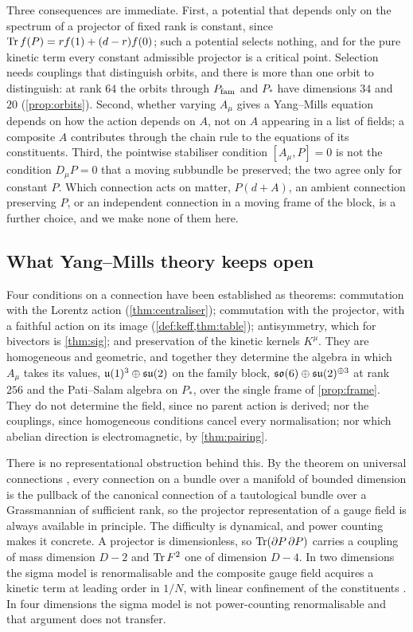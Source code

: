 Three consequences are immediate. First, a potential that depends only on the spectrum of a projector of fixed rank is constant,
since $\operatorname{Tr} f(P)=rf(1)+(d-r)f(0)$; such a potential selects nothing, and for the pure kinetic term every constant admissible projector
is a critical point. Selection needs couplings that distinguish orbits, and there is more than one orbit to distinguish: at rank
$64$ the orbits through $P_{\rm fam}$ and $P_*$ have dimensions $34$ and $20$ (\cref{prop:orbits}). Second, whether varying $A_\mu$ gives a
Yang--Mills equation depends on how the action depends on $A$, not on $A$ appearing in a list of fields; a composite $A$ contributes
through the chain rule to the equations of its constituents. Third, the pointwise stabiliser condition $[A_\mu,P]=0$ is not the
condition $D_\mu P=0$ that a moving subbundle be preserved; the two agree only for constant $P$. Which connection acts on matter,
$P(d+A)$, an ambient connection preserving $P$, or an independent connection in a moving frame of the block, is a further choice,
and we make none of them here.

\subsection{What Yang--Mills theory keeps open}
\label{sec:ym}

Four conditions on a connection have been established as theorems: commutation with the Lorentz action
(\cref{thm:centraliser}); commutation with the projector, with a faithful action on its image (\cref{def:keff,thm:table});
antisymmetry, which for bivectors is \cref{thm:sig}; and preservation of the kinetic kernels $K^\mu$. They are homogeneous and
geometric, and together they determine the algebra in which $A_\mu$ takes its values, $\mathfrak{u}(1)^3\oplus\mathfrak{su}(2)$ on the family block,
$\mathfrak{so}(6)\oplus\mathfrak{su}(2)^{\oplus3}$ at rank $256$ and the Pati--Salam algebra on $P_*$, over the single frame of \cref{prop:frame}. They do not
determine the field, since no parent action is derived; nor the couplings, since homogeneous conditions cancel every
normalisation; nor which abelian direction is electromagnetic, by \cref{thm:pairing}.

There is no representational obstruction behind this. By the theorem on universal connections \cite{NarasimhanRamanan}, every
connection on a bundle over a manifold of bounded dimension is the pullback of the canonical connection of a tautological bundle
over a Grassmannian of sufficient rank, so the projector representation of a gauge field is always available in principle. The
difficulty is dynamical, and power counting makes it concrete. A projector is dimensionless, so $\operatorname{Tr}(\partial P\,\partial P)$
carries a coupling of mass dimension $D-2$ and $\operatorname{Tr} F^2$ one of dimension $D-4$. In two dimensions the sigma model is
renormalisable and the composite gauge field acquires a kinetic term at leading order in $1/N$, with linear confinement of the
constituents \cite{DAddaDiVecchiaLuscher,Witten79}. In four dimensions the sigma model is not power-counting renormalisable and that
argument does not transfer.

